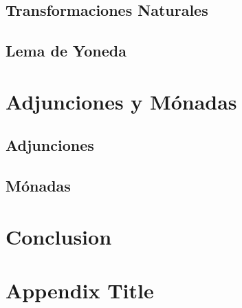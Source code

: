 \documentclass[12pt]{report}
\begin{document}
\section{Transformaciones Naturales}

\section{Lema de Yoneda}


\chapter{Adjunciones y Mónadas}
\section{Adjunciones}


\section{Mónadas}


\chapter{Conclusion}

\printbibliography

\appendix
\chapter{Appendix Title}
\end{document}
